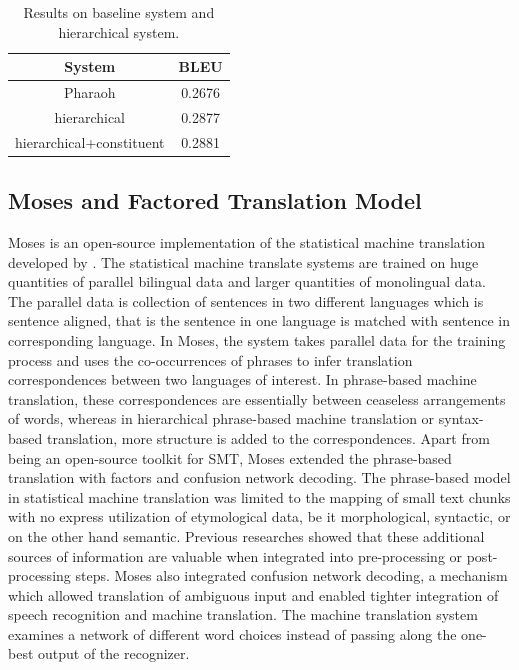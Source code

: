 \begin{table}[h]
\centering
\begin{tabular}{ |c|c| } 
 \hline System & BLEU  \\
 \hline
 Pharaoh & 0.2676  \\ 
 hierarchical & 0.2877 \\ 
  hierarchical+constituent & 0.2881 \\ 
 \hline
\end{tabular}
\caption{Results on baseline system and hierarchical system. \cite{Chiang:2005:HPM:1219840.1219873}}\label{hbmtt}
\end{table}

\subsection{Moses and Factored Translation Model}
Moses is an open-source implementation of the statistical machine translation developed by \cite{Koehn:2007:MOS:1557769.1557821}. The statistical machine translate systems are trained on huge quantities of parallel bilingual data and larger quantities of monolingual data. The parallel data is collection of sentences in two different languages which is sentence aligned, that is the sentence in one language is matched with sentence in corresponding language. In Moses, the system takes parallel data for the training process and uses the co-occurrences of phrases to infer translation correspondences between two languages of interest. In phrase-based machine translation, these correspondences are essentially between ceaseless arrangements of words, whereas in hierarchical phrase-based machine translation or syntax-based translation, more structure is added to the correspondences. Apart from being an open-source toolkit for SMT, Moses extended the phrase-based translation with factors and confusion network decoding. The phrase-based model in statistical machine translation was limited to the mapping of small text chunks with no express utilization of etymological data, be it morphological, syntactic, 
or on the other hand semantic. Previous researches showed that these additional sources of information are valuable when integrated into pre-processing or post-processing steps. Moses also integrated confusion network decoding, a mechanism which allowed translation of ambiguous input and enabled tighter integration of speech recognition and machine translation. The machine translation system examines a network of different word choices instead of passing along the one-best output of the recognizer. 
